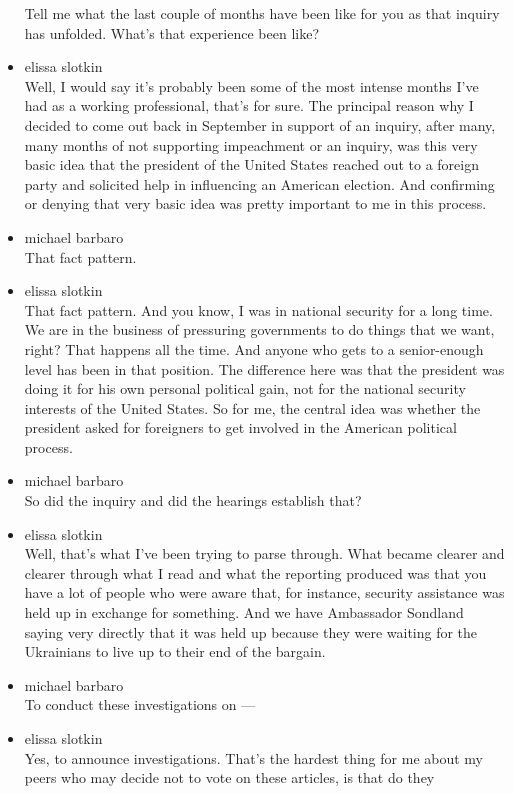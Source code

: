 \begin{itemize}
  Tell me what the last couple of months have been like for you as that
  inquiry has unfolded. What's that experience been like?
\item
  elissa slotkin\\
  Well, I would say it's probably been some of the most intense months
  I've had as a working professional, that's for sure. The principal
  reason why I decided to come out back in September in support of an
  inquiry, after many, many months of not supporting impeachment or an
  inquiry, was this very basic idea that the president of the United
  States reached out to a foreign party and solicited help in
  influencing an American election. And confirming or denying that very
  basic idea was pretty important to me in this process.
\item
  michael barbaro\\
  That fact pattern.
\item
  elissa slotkin\\
  That fact pattern. And you know, I was in national security for a long
  time. We are in the business of pressuring governments to do things
  that we want, right? That happens all the time. And anyone who gets to
  a senior-enough level has been in that position. The difference here
  was that the president was doing it for his own personal political
  gain, not for the national security interests of the United States. So
  for me, the central idea was whether the president asked for
  foreigners to get involved in the American political process.
\item
  michael barbaro\\
  So did the inquiry and did the hearings establish that?
\item
  elissa slotkin\\
  Well, that's what I've been trying to parse through. What became
  clearer and clearer through what I read and what the reporting
  produced was that you have a lot of people who were aware that, for
  instance, security assistance was held up in exchange for something.
  And we have Ambassador Sondland saying very directly that it was held
  up because they were waiting for the Ukrainians to live up to their
  end of the bargain.
\item
  michael barbaro\\
  To conduct these investigations on ---
\item
  elissa slotkin\\
  Yes, to announce investigations. That's the hardest thing for me about
  my peers who may decide not to vote on these articles, is that do they

\end{itemize}
